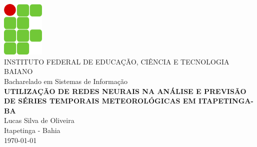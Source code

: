 \documentclass[12pt, openright, a4paper, brazil, oneside]{abntex2}
\begin{document}
    \begin{capa}
        \center
        \includegraphics[width=2cm]{template/ifbaiano.png}\\[0.2cm]
        {\ABNTEXchapterfont\LARGE INSTITUTO FEDERAL DE EDUCAÇÃO, CIÊNCIA E TECNOLOGIA BAIANO}\\[0.2cm]
        {\ABNTEXchapterfont\LARGE Bacharelado em Sistemas de Informação} \\[4cm]

        {\ABNTEXchapterfont\bfseries\LARGE UTILIZAÇÃO DE REDES NEURAIS NA ANÁLISE E PREVISÃO DE SÉRIES TEMPORAIS METEOROLÓGICAS EM ITAPETINGA-BA}\\[4cm]

        {\ABNTEXchapterfont\large Lucas Silva de Oliveira}\\[4cm]

        \vfill
        \large Itapetinga - Bahia\\
        \today
    \end{capa}
\end{document}
